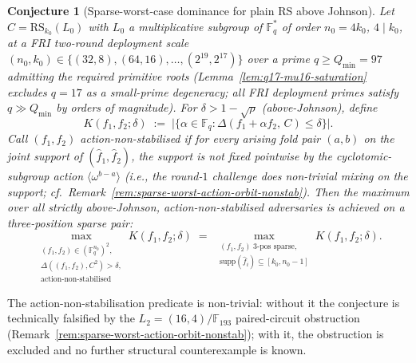 \documentclass[11pt]{article}
\newtheorem{conjecture}[theorem]{Conjecture}
\theoremstyle{definition}
\theoremstyle{remark}
\newcommand{\FF}{\mathbb{F}}
\begin{document}
\begin{conjecture}[Sparse-worst-case dominance for plain RS above Johnson]
\label{conj:sparse-worst}
Let $C = \mathrm{RS}_{k_0}(L_0)$ with $L_0$ a multiplicative subgroup
of $\FF_q^\ast$ of order $n_0 = 4 k_0$, $4 \mid k_0$, at a
FRI two-round deployment scale
$(n_0, k_0) \in \{(32, 8), (64, 16), \ldots, (2^{19}, 2^{17})\}$
over a prime $q \geq Q_{\min} = 97$ admitting the required primitive
roots (Lemma~\ref{lem:q17-mu16-saturation} excludes $q = 17$ as a
small-prime degeneracy; all FRI deployment primes satisfy $q \gg
Q_{\min}$ by orders of magnitude).
For $\delta > 1 - \sqrt{\rho}$ (above-Johnson), define
\[
 K(f_1, f_2; \delta)
 \;:=\;
 \big| \{\alpha \in \FF_q : \Delta(f_1 + \alpha f_2,\,C) \leq \delta\} \big|.
\]
Call $(f_1, f_2)$ \emph{action-non-stabilised} if for every arising
fold pair $(a, b)$ on the joint support of $(\hat f_1, \hat f_2)$, the
support is not fixed pointwise by the cyclotomic-subgroup action
$\langle\omega^{b-a}\rangle$ (i.e., the round-$1$ challenge does
non-trivial mixing on the support; cf.\
Remark~\ref{rem:sparse-worst-action-orbit-nonstab}). Then the maximum
over all strictly above-Johnson, action-non-stabilised adversaries is
achieved on a \emph{three-position sparse} pair:
\[
 \boxed{\quad
 \max_{\substack{(f_1, f_2) \in (\FF_q^{n_0})^2,\\
 \Delta((f_1, f_2), C^2) > \delta,\\ \text{action-non-stabilised}}}
 K(f_1, f_2; \delta)
 \;=\;
 \max_{
 \substack{(f_1, f_2) \;3\text{-pos sparse},\\
 \mathrm{supp}(\hat f_i) \subseteq [k_0, n_0 - 1]}
 }
 K(f_1, f_2; \delta).
 \quad}
\]
\end{conjecture}

\noindent The action-non-stabilisation predicate is non-trivial:
without it the conjecture is technically falsified by the
$L_2 = (16, 4)/\FF_{193}$ paired-circuit obstruction
(Remark~\ref{rem:sparse-worst-action-orbit-nonstab}); with it, the
obstruction is excluded and no further structural counterexample is
known.
\end{document}
